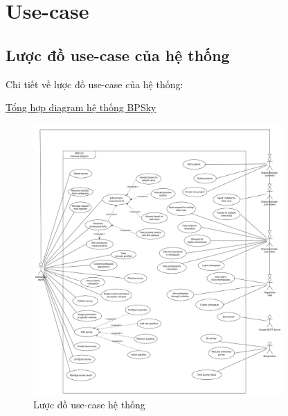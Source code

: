 \section{Use-case}
\subsection{Lược đồ use-case của hệ thống}

Chi tiết về lược đồ use-case của hệ thống:

\href{https://app.diagrams.net/#G1Myz6UnduM7vZYhCvuX0KpLPWf_OdprEM#%7B%22pageId%22%3A%22aGwoCCFz17a1391KKWEK%22%7D}{Tổng hợp diagram hệ thống BPSky}

\begin{figure}[H]
    \begin{center}
        \includegraphics[width=0.85\textwidth]{Content/Phân tích và thiết kế hệ thống/documents/Use case/images/System usecase - HK232.png}
        \vspace{0.5cm}
        \caption{Lược đồ use-case hệ thống}
        \label{fig: Lược đồ use-case hệ thống}
    \end{center}
\end{figure}





